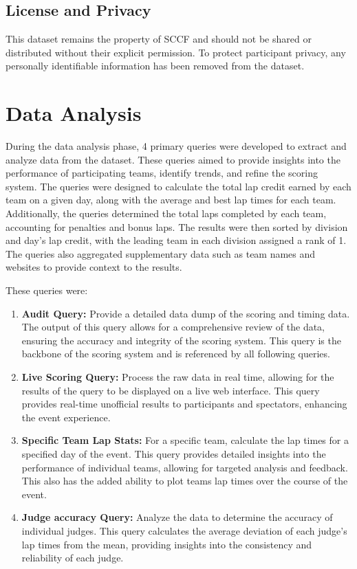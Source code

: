\documentclass[11pt]{article}
\begin{document}
\subsection{License and Privacy}

This dataset remains the property of SCCF and should not be shared or distributed without their explicit permission. To protect participant privacy, any personally identifiable information has been removed from the dataset.






\section{Data Analysis}

During the data analysis phase, 4 primary queries were developed to extract and analyze data from the dataset. These queries aimed to provide insights into the performance of participating teams, identify trends, and refine the scoring system. The queries were designed to calculate the total lap credit earned by each team on a given day, along with the average and best lap times for each team. Additionally, the queries determined the total laps completed by each team, accounting for penalties and bonus laps. The results were then sorted by division and day's lap credit, with the leading team in each division assigned a rank of 1. The queries also aggregated supplementary data such as team names and websites to provide context to the results.

These queries were:

\begin{enumerate}
    \item \textbf{Audit Query:} Provide a detailed data dump of the scoring and timing data. The output of this query allows for a comprehensive review of the data, ensuring the accuracy and integrity of the scoring system. This query is the backbone of the scoring system and is referenced by all following queries.
    \item \textbf{Live Scoring Query:} Process the raw data in real time, allowing for the results of the query to be displayed on a live web interface. This query provides real-time unofficial results to participants and spectators, enhancing the event experience.
    \item \textbf{Specific Team Lap Stats:} For a specific team, calculate the lap times for a specified day of the event. This query provides detailed insights into the performance of individual teams, allowing for targeted analysis and feedback. This also has the added ability to plot teams lap times over the course of the event.
    \item \textbf{Judge accuracy Query:} Analyze the data to determine the accuracy of individual judges. This query calculates the average deviation of each judge's lap times from the mean, providing insights into the consistency and reliability of each judge.
\end{enumerate}
\end{document}
